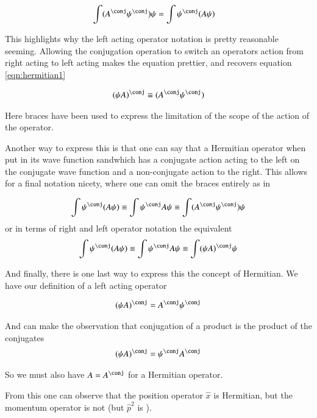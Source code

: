 \documentclass{article}
\begin{document}
\begin{align*}
\int (A^\conj \psi^\conj) \psi &= \int \psi^\conj (A \psi)
\end{align*}

This highlights why the left acting operator notation is pretty reasonable
seeming.  Allowing the conjugation operation to switch an operators action
from right acting to left acting makes the equation prettier, and 
recovers equation \ref{eqn:hermitian1}

\begin{align*}
(\psi A)^\conj \equiv (A^\conj \psi^\conj) 
\end{align*}

Here braces have been used to express the limitation of the scope of the action of the operator.

Another way to express this is that one can say that a Hermitian operator when put 
in its wave function sandwhich has a 
conjugate action acting to the left on the conjugate wave function and a non-conjugate
action to the right.  This allows for a final notation nicety, where one can omit the 
braces entirely as in

\begin{align*}
\int \psi^\conj (A \psi) \equiv \int \psi^\conj A \psi \equiv \int (A^\conj \psi^\conj) \psi
\end{align*}
or in terms of right and left operator notation the equivalent
\begin{align*}
\int \psi^\conj (A \psi) \equiv \int \psi^\conj A \psi \equiv \int (\psi A)^\conj \psi
\end{align*}

And finally, there is one last way to express this the concept of Hermitian.
We have our definition of a left acting operator

\begin{align*}
(\psi A)^\conj = A^\conj \psi^\conj
\end{align*}

And can make the observation that conjugation of a product is the 
product of the conjugates
\begin{align*}
(\psi A)^\conj = \psi^\conj A^\conj
\end{align*}

So we must also have $A = A^\conj$ for a Hermitian operator.  

From this one can observe that the position operator $\hat{x}$ is Hermitian, but the momentum operator is not (but $\hat{p}^2$ is ).
\end{document}
